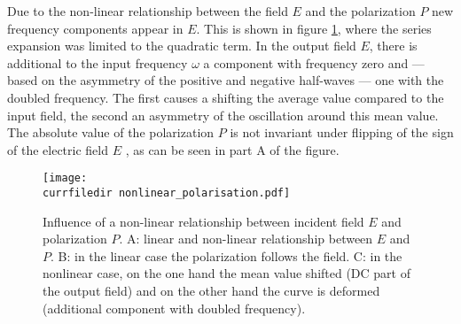 Due to the non-linear relationship between the field $E$ and the
polarization $P$ new frequency components appear in $E$. This
is shown in  figure \ref{fig:shg_nonlinear_polarization},
where the series expansion was limited to the quadratic term. In the output field $E$, there is  additional to the 
input frequency $\omega$ a component with frequency zero and --- based on the asymmetry of the positive and negative half-waves ---
one with the doubled frequency. The first causes a
shifting the average value compared to the input field, the second
an asymmetry of the oscillation around this mean value. The absolute value of the polarization $P$ is not invariant under flipping of the  sign of the electric field $E$ , as can be seen in part A of the figure.


\begin{figure}
\center
\texttt{[image: \\currfiledir nonlinear\_polarisation.pdf]}
\caption{Influence of a non-linear relationship between
incident field $E$ and polarization $P$. A: linear and non-linear relationship
between $E$ and $P$. B: in the linear case the polarization follows
the field. C: in the nonlinear case, on the one hand the mean value
shifted (DC part of the output field) and on the other hand the
curve is deformed (additional component with doubled frequency).}
\label{fig:shg_nonlinear_polarization}
\end{figure}




